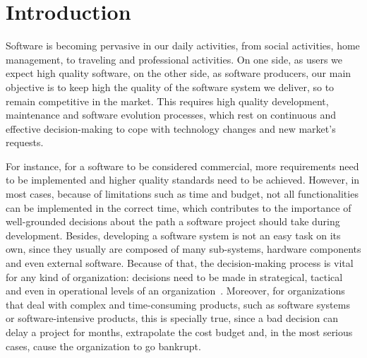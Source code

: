 \section{Introduction}
\label{sec-intro}
%
Software is becoming  pervasive in our daily activities,  from social activities, home management, to traveling and professional activities. On one side, as users we expect high quality software, on the other side,  as software producers, our main objective is to keep high  the quality of the software system we deliver, so to remain competitive in the market. This requires high quality development, maintenance and software evolution processes, which rest on continuous and effective decision-making to cope with technology changes and new  market's requests. 

For instance, for a software to be considered commercial, more requirements need to be implemented and higher quality standards need to be achieved. However, in most cases, because of limitations such as time and budget, not all functionalities can be implemented in the correct time, which contributes to the importance of well-grounded decisions about the path a software project should take during development. Besides, developing a software system is not an easy task on its own, since they usually are composed of many sub-systems, hardware components and even external software. Because of that, the decision-making process is vital for any kind of organization: decisions need to be made in strategical, tactical and even in operational levels of an organization~\cite{aurum2003fundamental}. Moreover, for organizations that deal with complex and time-consuming products, such as software systems or software-intensive products, this is specially true, since a bad decision can delay a project for months, extrapolate the cost budget and, in the most serious cases, cause the organization to go bankrupt. 

